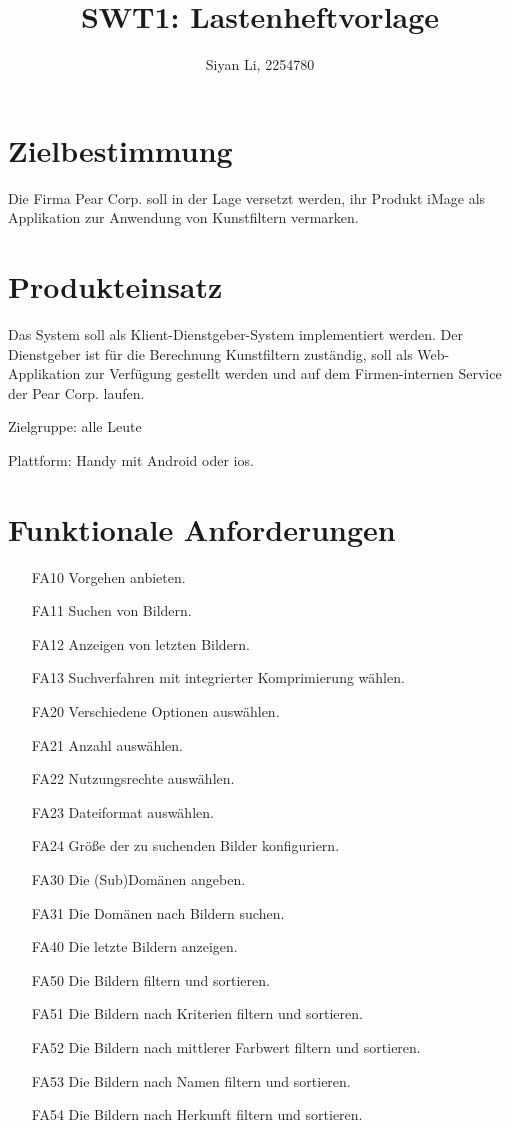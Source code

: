 \documentclass[parskip=full]{scrartcl}
\title{SWT1: Lastenheftvorlage}
\author{Siyan Li, 2254780}
\begin{document}
\maketitle


%
%
\section{Zielbestimmung}
Die Firma Pear Corp. soll in der Lage versetzt werden, ihr Produkt iMage als Applikation zur Anwendung von Kunstfiltern vermarken.

\section{Produkteinsatz}
Das System soll als Klient-Dienstgeber-System implementiert werden.
Der Dienstgeber ist für die Berechnung Kunstfiltern  zuständig, soll als Web-Applikation zur Verfügung gestellt werden und auf dem Firmen-internen
Service der Pear Corp. laufen.

Zielgruppe: alle Leute

Plattform: Handy mit Android oder ios.

\section{Funktionale Anforderungen}
\begin{itemize}[nosep]
	\item[FA10] Vorgehen anbieten.
	\item[FA11] Suchen von Bildern.
	\item[FA12] Anzeigen von letzten Bildern.
	\item[FA13] Suchverfahren mit integrierter Komprimierung wählen.  
	\item[FA20] Verschiedene Optionen auswählen.
	\item[FA21] Anzahl auswählen.
	\item[FA22] Nutzungsrechte auswählen.
	\item[FA23] Dateiformat auswählen.
	\item[FA24] Größe der zu suchenden Bilder konfiguriern.
	\item[FA30] Die (Sub)Domänen angeben.
	\item[FA31] Die Domänen nach Bildern suchen.
	\item[FA40] Die letzte Bildern anzeigen.
	\item[FA50] Die Bildern filtern und sortieren.
	\item[FA51] Die Bildern nach  Kriterien filtern und sortieren.
	\item[FA52] Die Bildern nach mittlerer Farbwert filtern und sortieren.
	\item[FA53] Die Bildern nach  Namen filtern und sortieren.
	\item[FA54] Die Bildern nach  Herkunft filtern und sortieren. 

\end{itemize}
\end{document}
